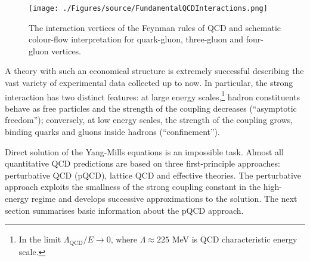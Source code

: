 \begin{figure}[t]
	\centering
		\texttt{[image: ./Figures/source/FundamentalQCDInteractions.png]}
	\caption{The interaction vertices of the Feynman rules of QCD and schematic colour-flow interpretation for quark-gluon, three-gluon and four-gluon vertices.}
	\label{fig:FundamentalQCDInteractions}
\end{figure}

A theory with such an economical structure is extremely successful describing the vast variety of experimental data collected up to now. In particular, the strong interaction has two distinct features: at large energy scales,\footnote{In the limit $\Lambda_\mathrm{QCD}/E\rightarrow 0$, where $\Lambda\approx 225$ MeV is QCD characteristic energy scale.} hadron constituents behave as free particles and the strength of the coupling decreases (``asymptotic freedom''); conversely, at low energy scales, the strength of the coupling grows, binding quarks and gluons inside hadrons (``confinement'').  
 
Direct solution of the Yang-Mills equations is an impossible task. Almost all quantitative QCD predictions are based on three first-principle approaches: perturbative QCD (pQCD), lattice QCD and effective theories. The perturbative approach exploits the smallness of the strong coupling constant in the high-energy regime and develops successive approximations to the solution. The next section summarises basic information about the pQCD approach.


